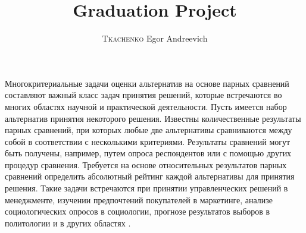 \documentclass[specialist,
substylefile = spbu.rtx,
               subf,href,colorlinks=true, 12pt]{disser}
\begin{document}


    \date{\number\year}

    \maketitle

    \title{Graduation Project}
    \author{\textsc{Tkachenko} Egor Andreevich} %
    \group{}


    \date{\number\year}

    \maketitle[en]



    \pagebreak
    \tableofcontents
    \pagebreak

    \intro

    Многокритериальные задачи оценки альтернатив на основе парных сравнений составляют важный класс задач принятия решений, которые встречаются во многих областях научной и практической деятельности. Пусть имеется набор альтернатив принятия некоторого решения. Известны количественные результаты парных сравнений, при которых любые две альтернативы сравниваются между собой в соответствии с несколькими критериями. Результаты сравнений могут быть получены, например, путем опроса респондентов или с помощью других процедур сравнения. Требуется на основе относительных результатов парных сравнений определить абсолютный рейтинг каждой альтернативы для принятия решения. Такие задачи встречаются при принятии управленческих решений в менеджменте, изучении предпочтений покупателей в маркетинге, анализе социологических опросов в социологии, прогнозе результатов выборов в политологии и в других областях \cite{Saaty1993Prinyatie}. 
\end{document}
